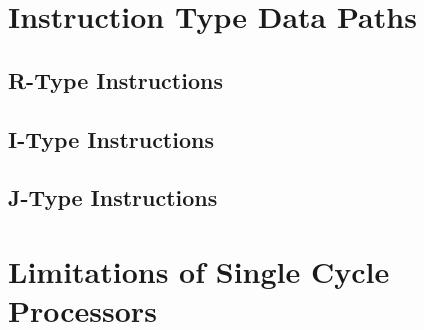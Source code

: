 \documentclass[12pt letter]{report}
\begin{document}
\chapter{Instruction Type Data Paths}

\section{R-Type Instructions}

\section{I-Type Instructions}

\section{J-Type Instructions}

\chapter{Limitations of Single Cycle Processors}
\end{document}
